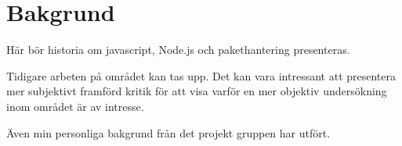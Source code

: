 \section{Bakgrund}
\label{sec:joel_a-background}
Här bör historia om javascript, Node.js och pakethantering presenteras.

Tidigare arbeten på området kan tas upp. Det kan vara intressant att presentera mer subjektivt framförd kritik för att visa varför en mer objektiv undersökning inom området är av intresse.

Även min personliga bakgrund från det projekt gruppen har utfört.
